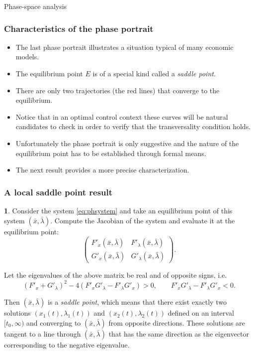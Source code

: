\documentclass[10pt]{beamer}
\theoremstyle{definition}
\newtheorem{Fact}{\translate{Fact}}
\begin{document}
\begin{section}{Phase-space analysis}
\begin{frame}[fragile]
\frametitle{Characteristics of the phase portrait}
\begin{itemize}\itemsep1em
\item The last phase portrait illustrates a situation typical of many economic models.
\item The equilibrium point $ E $ is of a special kind called a \emph{saddle point}.
\item There are only two trajectories (the red lines) that converge to the equilibrium.
\item Notice that in an optimal control context these curves will be natural candidates to check in order to verify that the transversality condition holds.
\item Unfortunately the phase portrait is only suggestive and the nature of the equilibrium point has to be established through formal means.
\item The next result provides a more precise characterization.
\end{itemize}
\end{frame}

\begin{frame}[fragile]
\frametitle{A local saddle point result}
\begin{Fact}
Consider the system \eqref{eq:phsystem} and take an equilibrium point of this system $ (\bar{x},\bar{\lambda}) $. Compute the Jacobian of the system and evaluate it at the equilibrium point:
\[ \begin{pmatrix}
F'_x(\bar{x},\bar{\lambda})& F'_{\lambda}(\bar{x},\bar{\lambda})\\
G'_x(\bar{x},\bar{\lambda})& G'_{\lambda}(\bar{x},\bar{\lambda})
\end{pmatrix} .\]

Let the eigenvalues of the above matrix be real and of opposite signs, i.e. \[ (F'_x + G'_\lambda)^2-4(F'_x G'_\lambda - F'_{\lambda} G'_x) >0,\qquad F'_x G'_\lambda - F'_{\lambda} G'_x < 0. \]

Then $ (\bar{x},\bar{\lambda}) $ is a \emph{saddle point}, which means that there exist exactly two solutions $ (x_1(t),\lambda_1(t)) $ and $ (x_2(t),\lambda_2(t)) $ defined on an interval $ [t_0,\infty) $ and converging to $ (\bar{x},\bar{\lambda}) $ from opposite directions. These solutions are tangent to a line through $ (\bar{x},\bar{\lambda}) $ that has the same direction as the eigenvector corresponding to the negative eigenvalue.
\label{fc:locsaddlept}
\end{Fact}
\end{frame}


\end{section}
\end{document}
